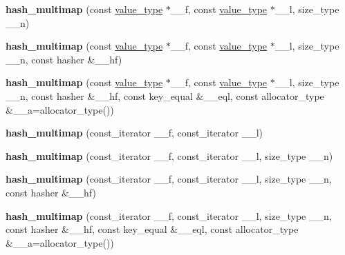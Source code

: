 \begin{DoxyCompactItemize}
\mbox{\label{classhash__multimap_afaa49ad77f00ee92e9e19b2192b2555f}} 
{\bfseries hash\+\_\+multimap} (const \hyperlink{structpair}{value\+\_\+type} $\ast$\+\_\+\+\_\+f, const \hyperlink{structpair}{value\+\_\+type} $\ast$\+\_\+\+\_\+l, size\+\_\+type \+\_\+\+\_\+n)
\item 
\mbox{\label{classhash__multimap_a91aceca1df8c3c84696517311698af9e}} 
{\bfseries hash\+\_\+multimap} (const \hyperlink{structpair}{value\+\_\+type} $\ast$\+\_\+\+\_\+f, const \hyperlink{structpair}{value\+\_\+type} $\ast$\+\_\+\+\_\+l, size\+\_\+type \+\_\+\+\_\+n, const hasher \&\+\_\+\+\_\+hf)
\item 
\mbox{\label{classhash__multimap_ab908c9c88fef4f0d86381f58998fde4c}} 
{\bfseries hash\+\_\+multimap} (const \hyperlink{structpair}{value\+\_\+type} $\ast$\+\_\+\+\_\+f, const \hyperlink{structpair}{value\+\_\+type} $\ast$\+\_\+\+\_\+l, size\+\_\+type \+\_\+\+\_\+n, const hasher \&\+\_\+\+\_\+hf, const key\+\_\+equal \&\+\_\+\+\_\+eql, const allocator\+\_\+type \&\+\_\+\+\_\+a=allocator\+\_\+type())
\item 
\mbox{\label{classhash__multimap_a2c2b7db1083c7548ee1857cb7c3ecf63}} 
{\bfseries hash\+\_\+multimap} (const\+\_\+iterator \+\_\+\+\_\+f, const\+\_\+iterator \+\_\+\+\_\+l)
\item 
\mbox{\label{classhash__multimap_adafc2e098ad14ff12568fb09dce8c078}} 
{\bfseries hash\+\_\+multimap} (const\+\_\+iterator \+\_\+\+\_\+f, const\+\_\+iterator \+\_\+\+\_\+l, size\+\_\+type \+\_\+\+\_\+n)
\item 
\mbox{\label{classhash__multimap_a0f6b9f72ea6fb94d66c0a7077dbc64a7}} 
{\bfseries hash\+\_\+multimap} (const\+\_\+iterator \+\_\+\+\_\+f, const\+\_\+iterator \+\_\+\+\_\+l, size\+\_\+type \+\_\+\+\_\+n, const hasher \&\+\_\+\+\_\+hf)
\item 
\mbox{\label{classhash__multimap_a772cc732c594e0a27c87e41f594a6c58}} 
{\bfseries hash\+\_\+multimap} (const\+\_\+iterator \+\_\+\+\_\+f, const\+\_\+iterator \+\_\+\+\_\+l, size\+\_\+type \+\_\+\+\_\+n, const hasher \&\+\_\+\+\_\+hf, const key\+\_\+equal \&\+\_\+\+\_\+eql, const allocator\+\_\+type \&\+\_\+\+\_\+a=allocator\+\_\+type())

\end{DoxyCompactItemize}
